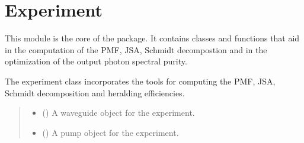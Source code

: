 \documentclass[a4paper,10pt,english]{sphinxmanual}
\begin{document}
\chapter{Experiment}
\label{\detokenize{experiment:module-pyjsa.experiment}}\label{\detokenize{experiment:experiment}}\label{\detokenize{experiment::doc}}
\sphinxAtStartPar
This module is the core of the package. It contains classes and functions that aid in the computation of the PMF, JSA, Schmidt decompostion and in the optimization of the output photon spectral purity.

\begin{fulllineitems}
\label{\detokenize{experiment:pyjsa.experiment.Experiment}}
\pysigstartsignatures
{}
\pysigstopsignatures
\sphinxAtStartPar
The experiment class incorporates the tools for computing the PMF, JSA, Schmidt decomposition and heralding efficiencies.
\begin{quote}\begin{description}
\begin{itemize}
\item {} 
\sphinxAtStartPar
{} ({\hyperref[\detokenize{waveguide:pyjsa.waveguide.Waveguide}]{}}) \textendash{} A waveguide object for the experiment.

\item {} 
\sphinxAtStartPar
{} ({\hyperref[\detokenize{pump:pyjsa.pump.Pump}]{}}) \textendash{} A pump object for the experiment.


\end{itemize}
\end{description}
\end{quote}
\end{fulllineitems}
\end{document}
